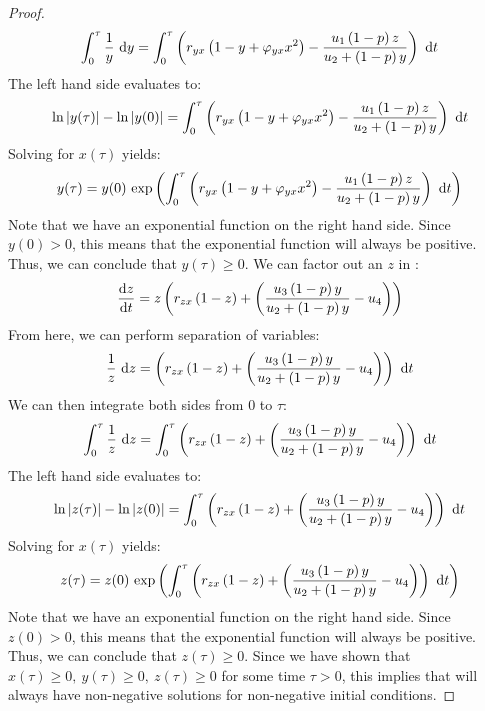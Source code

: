 \begin{proof}
    \begin{equation*}
        \int_0^\tau \frac{1}{y}\ \opdiff{y} = \int_0^\tau \left(r_{yx}\left(1-y+\varphi_{yx}x^2\right)-\frac{u_1\left(1-p\right)z}{u_2+\left(1-p\right)y}\right)\ \opdiff{t}
    \end{equation*}
    The left hand side evaluates to:
    \begin{equation*}
        \ln{y(\tau)}-\ln{y(0)} = \int_0^\tau \left(r_{yx}\left(1-y+\varphi_{yx}x^2\right)-\frac{u_1\left(1-p\right)z}{u_2+\left(1-p\right)y}\right)\ \opdiff{t}
    \end{equation*}
    Solving for $x(\tau)$ yields:
    \begin{equation*}
        y(\tau) = y(0)\ \exp{\int_0^\tau \left(r_{yx}\left(1-y+\varphi_{yx}x^2\right)-\frac{u_1\left(1-p\right)z}{u_2+\left(1-p\right)y}\right)\ \opdiff{t}}
    \end{equation*}
    Note that we have an exponential function on the right hand side. Since $y(0) > 0$, this means that the exponential function will always be positive. Thus, we can conclude that $y(\tau) \geq 0$. We can factor out an $z$ in :
    \begin{equation*}
        \diff[]{z}{t} = z\left(r_{zx}\left(1-z\right)+\left(\frac{u_3\left(1-p\right)y}{u_2+\left(1-p\right)y}-u_4\right)\right)
    \end{equation*}
    From here, we can perform separation of variables:
    \begin{equation*}
        \frac{1}{z}\ \opdiff{z} = \left(r_{zx}\left(1-z\right)+\left(\frac{u_3\left(1-p\right)y}{u_2+\left(1-p\right)y}-u_4\right)\right)\ \opdiff{t}
    \end{equation*}
    We can then integrate both sides from 0 to $\tau$:
    \begin{equation*}
        \int_0^\tau \frac{1}{z}\ \opdiff{z} = \int_0^\tau \left(r_{zx}\left(1-z\right)+\left(\frac{u_3\left(1-p\right)y}{u_2+\left(1-p\right)y}-u_4\right)\right)\ \opdiff{t}
    \end{equation*}
    The left hand side evaluates to:
    \begin{equation*}
        \ln{z(\tau)}-\ln{z(0)} = \int_0^\tau \left(r_{zx}\left(1-z\right)+\left(\frac{u_3\left(1-p\right)y}{u_2+\left(1-p\right)y}-u_4\right)\right)\ \opdiff{t}
    \end{equation*}
    Solving for $x(\tau)$ yields:
    \begin{equation*}
        z(\tau) = z(0)\ \exp{\int_0^\tau \left(r_{zx}\left(1-z\right)+\left(\frac{u_3\left(1-p\right)y}{u_2+\left(1-p\right)y}-u_4\right)\right)\ \opdiff{t}}
    \end{equation*}
    Note that we have an exponential function on the right hand side. Since $z(0) > 0$, this means that the exponential function will always be positive. Thus, we can conclude that $z(\tau) \geq 0$. Since we have shown that $x(\tau) \geq 0,\ y(\tau) \geq 0,\ z(\tau) \geq 0$ for some time $\tau > 0$, this implies that  will always have non-negative solutions for non-negative initial conditions.
\end{proof}


